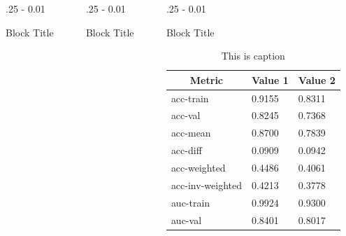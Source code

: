 \documentclass{postertheme}\usepackage[]{graphicx}\usepackage[]{color}
\begin{document}
\begin{frame}
\begin{columns}[onlytextwidth]
\end{columns}


\begin{columns}[onlytextwidth]
  
  \begin{column}{.25 \textwidth - 0.01 \textwidth}
    \begin{block}{Block Title}
      \lipsum[4]
    \end{block}
  \end{column}

  \begin{column}{.25 \textwidth - 0.01 \textwidth}
    \begin{block}{Block Title}
      \lipsum[4]
    \end{block}
  \end{column}

  \begin{column}{.25 \textwidth - 0.01 \textwidth}
    \begin{block}{Block Title}
      
      \begin{table}
        \centering
        \begin{tabular}{|l|l|l|}
        \hline
        \multicolumn{1}{|c|}{Metric} & \multicolumn{1}{c|}{Value 1} & \multicolumn{1}{c|}{Value 2} \\ \hline
        acc-train        & 0.9155 & 0.8311 \\ \hline
        acc-val          & 0.8245 & 0.7368 \\ \hline
        acc-mean         & 0.8700 & 0.7839 \\ \hline
        acc-diff         & 0.0909 & 0.0942 \\ \hline
        acc-weighted     & 0.4486 & 0.4061 \\ \hline
        acc-inv-weighted & 0.4213 & 0.3778 \\ \hline
        auc-train        & 0.9924 & 0.9300 \\ \hline
        auc-val          & 0.8401 & 0.8017 \\ \hline
        \end{tabular}
        
        \vskip0.35in
        \caption{This is caption}
        \label{tab:my-table}
        \end{table}
      

\end{block}
\end{column}
\end{columns}
\end{frame}
\end{document}
